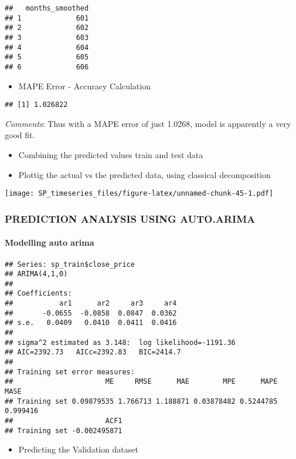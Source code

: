 \documentclass[]{article}
\providecommand{\tightlist}{%
  \setlength{\itemsep}{0pt}\setlength{\parskip}{0pt}}
\let\oldparagraph\paragraph
\renewcommand{\paragraph}[1]{\oldparagraph{#1}\mbox{}}
\begin{document}
\begin{verbatim}
##   months_smoothed
## 1             601
## 2             602
## 3             603
## 4             604
## 5             605
## 6             606
\end{verbatim}

\begin{itemize}
\tightlist
\item
  MAPE Error - Accuracy Calculation
\end{itemize}

\begin{verbatim}
## [1] 1.026822
\end{verbatim}

\emph{Comments}: Thus with a MAPE error of just 1.0268, model is
apparently a very good fit.

\begin{itemize}
\item
  Combining the predicted values train and test data
\item
  Plottig the actual vs the predicted data, using classical
  decomposition
\end{itemize}

\texttt{[image: SP\_timeseries\_files/figure-latex/unnamed-chunk-45-1.pdf]}

\subsubsection{PREDICTION ANALYSIS USING
AUTO.ARIMA}\label{prediction-analysis-using-auto.arima}

\paragraph{Modelling auto arima}\label{modelling-auto-arima}

\begin{verbatim}
## Series: sp_train$close_price 
## ARIMA(4,1,0) 
## 
## Coefficients:
##           ar1      ar2     ar3     ar4
##       -0.0655  -0.0858  0.0847  0.0362
## s.e.   0.0409   0.0410  0.0411  0.0416
## 
## sigma^2 estimated as 3.148:  log likelihood=-1191.36
## AIC=2392.73   AICc=2392.83   BIC=2414.7
## 
## Training set error measures:
##                      ME     RMSE      MAE        MPE      MAPE     MASE
## Training set 0.09879535 1.766713 1.188871 0.03878482 0.5244785 0.999416
##                      ACF1
## Training set -0.002495871
\end{verbatim}

\begin{itemize}
\tightlist
\item
  Predicting the Validation dataset
\end{itemize}
\end{document}
